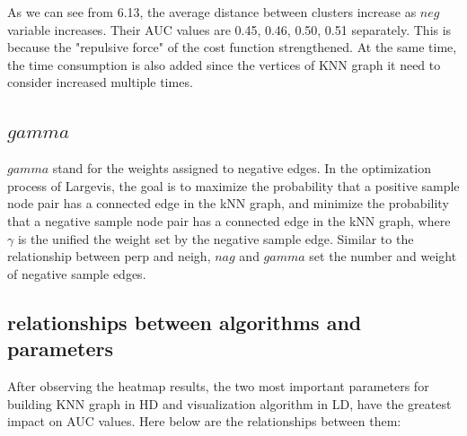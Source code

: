 \noindent As we can see from 6.13, the average distance between clusters increase as $neg$ variable increases. Their AUC values are 0.45, 0.46, 0.50, 0.51 separately. This is because the "repulsive force" of the cost function strengthened. At the same time, the time consumption is also added since the vertices of KNN graph it need to consider increased multiple times. 

\subsection{$gamma$}

$gamma$ stand for the weights assigned to negative edges. In the optimization process of Largevis, the goal is to maximize the probability that a positive sample node pair has a connected edge in the kNN graph, and minimize the probability that a negative sample node pair has a connected edge in the kNN graph, where $\gamma$ is the unified the weight set by the negative sample edge. Similar to the relationship between perp and neigh, $nag$ and $gamma$ set the number and weight of negative sample edges.

\subsection{relationships between algorithms and parameters}


After observing the heatmap results, the two most important parameters for building KNN graph in HD and visualization algorithm in LD, have the greatest impact on AUC values. Here below are the relationships between them:

